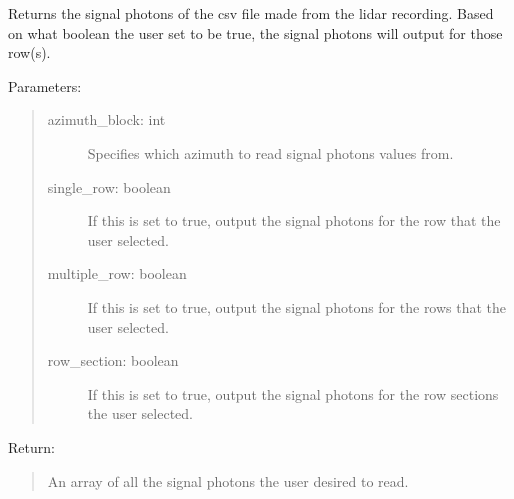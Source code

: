 \documentclass[letterpaper,10pt,english]{sphinxmanual}
\begin{document}
\begin{fulllineitems}
\label{\detokenize{Lidar extraction tool:lidar_extract.get_signal_photons}}
Returns the signal photons of the csv file made from the lidar recording. Based on what boolean the user set to be true,
the signal photons will output for those row(s).

Parameters:
\begin{quote}
\begin{description}
\item[{azimuth\_block: int}] \leavevmode
Specifies which azimuth to read signal photons values from.

\item[{single\_row: boolean}] \leavevmode
If this is set to true, output the signal photons for the row that the user selected.

\item[{multiple\_row: boolean}] \leavevmode
If this is set to true, output the signal photons for the rows that the user selected.

\item[{row\_section: boolean}] \leavevmode
If this is set to true, output the signal photons for the row sections the user selected.

\end{description}
\end{quote}

Return:
\begin{quote}

An array of all the signal photons the user desired to read.
\end{quote}

\end{fulllineitems}

\end{document}
